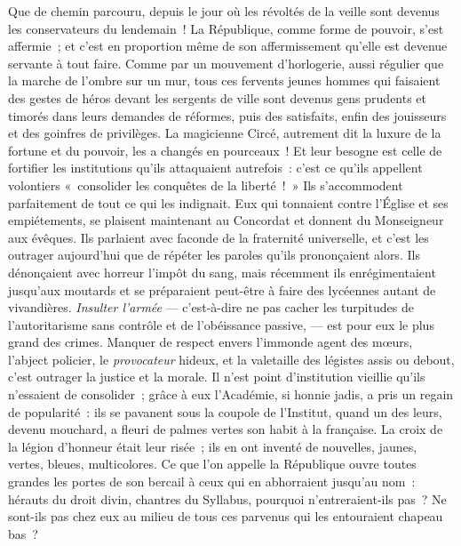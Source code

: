 \documentclass[french,twoside]{book} %
\begin{document}
Que de chemin parcouru, depuis le jour où les révoltés de la veille sont devenus les conservateurs du lendemain ! La République, comme forme de pouvoir, s’est affermie ; et c’est en proportion même de son affermissement qu’elle est devenue servante à tout faire. Comme par un mouvement d’horlogerie, aussi régulier que la marche de l’ombre sur un mur, tous ces fervents jeunes hommes qui faisaient des gestes de héros  devant les sergents de ville sont devenus gens prudents et timorés dans leurs demandes de réformes, puis des satisfaits, enfin des jouisseurs et des goinfres de privilèges. La magicienne Circé, autrement dit la luxure de la fortune et du pouvoir, les a changés en pourceaux ! Et leur besogne est celle de fortifier les institutions qu’ils attaquaient autrefois : c’est ce qu’ils appellent volontiers « consolider les conquêtes de la liberté ! » Ils s’accommodent parfaitement de tout ce qui les indignait. Eux qui tonnaient contre l’Église et ses empiétements, se plaisent maintenant au Concordat et donnent du Monseigneur aux évêques. Ils parlaient avec faconde de la fraternité universelle, et c’est les outrager aujourd’hui que de répéter les paroles qu’ils  prononçaient alors. Ils dénonçaient avec horreur l’impôt du sang, mais récemment ils enrégimentaient jusqu’aux moutards et se préparaient peut-être à faire des lycéennes autant de vivandières. \emph{Insulter l’armée} — c’est-à-dire ne pas cacher les turpitudes de l’autoritarisme sans contrôle et de l’obéissance passive, — est pour eux le plus grand des crimes. Manquer de respect envers l’immonde agent des mœurs, l’abject policier, le \emph{provocateur} hideux, et la valetaille des légistes assis ou debout, c’est outrager la justice et la morale. Il n’est point d’institution vieillie qu’ils n’essaient de consolider ; grâce à eux l’Académie, si honnie jadis, a pris un regain de popularité : ils se pavanent sous la coupole de l’Institut, quand un  des leurs, devenu mouchard, a fleuri de palmes vertes son habit à la française. La croix de la légion d’honneur était leur risée ; ils en ont inventé de nouvelles, jaunes, vertes, bleues, multicolores. Ce que l’on appelle la République ouvre toutes grandes les portes de son bercail à ceux qui en abhorraient jusqu’au nom : hérauts du droit divin, chantres du Syllabus, pourquoi n’entreraient-ils pas ? Ne sont-ils pas chez eux au milieu de tous ces parvenus qui les entouraient chapeau bas ?\par
\end{document}
